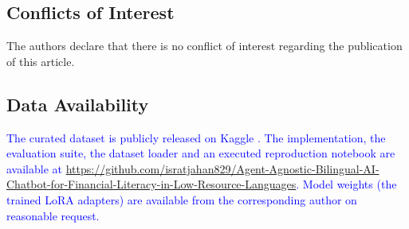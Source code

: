 \documentclass{article}
\newcommand{\revised}[1]{\textcolor{blue}{#1}}
\newcommand{\revised}[1]{#1}
\begin{document}
\subsection*{Conflicts of Interest}
The authors declare that there is no conflict of interest regarding the publication of
this article.

\subsection*{Data Availability}
\revised{The curated dataset is publicly released on Kaggle \cite{banglafingpt2026}.
The implementation, the evaluation suite, the dataset loader and an executed
reproduction notebook are available at
\revised{\url{https://github.com/isratjahan829/Agent-Agnostic-Bilingual-AI-Chatbot-for-Financial-Literacy-in-Low-Resource-Languages}}. Model weights (the trained LoRA adapters) are available from
the corresponding author on reasonable request.}

\printbibliography
\end{document}

